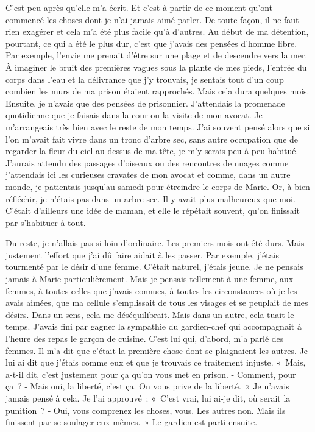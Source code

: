 \documentclass[french,twoside]{book} %
\begin{document}
C'est peu après qu’elle m’a écrit. Et c’est à partir de ce moment qu’ont commencé les choses dont je n’ai jamais aimé parler. De toute façon, il ne faut rien exagérer et cela m’a été plus facile qu’à d’autres. Au début de ma détention, pourtant, ce qui a été le plus dur, c’est que j’avais des pensées d’homme libre. Par exemple, l’envie me prenait d’être sur une plage et de descendre vers la mer. À imaginer le bruit des premières vagues sous la plante de mes pieds, l’entrée du corps dans l’eau et la délivrance que j’y trouvais, je sentais tout d’un coup combien les murs de ma prison étaient rapprochés. Mais cela dura quelques mois. Ensuite, je n’avais que des pensées de prisonnier. J'attendais la promenade quotidienne que je faisais dans la cour ou la visite de mon avocat. Je m’arrangeais très bien avec le reste de mon temps. J'ai souvent pensé alors que si l’on m’avait fait vivre dans un tronc d’arbre sec, sans autre occupation que de regarder la fleur du ciel au-dessus de ma tête, je m’y serais peu à peu habitué. J'aurais attendu des passages d’oiseaux ou des rencontres de nuages comme j’attendais ici les curieuses cravates de mon avocat et comme, dans un autre monde, je patientais jusqu’au samedi pour étreindre le corps de Marie. Or, à bien réfléchir, je n’étais pas dans un arbre sec. Il y avait plus malheureux que moi. C'était d’ailleurs une idée de maman, et elle le répétait souvent, qu’on finissait par s’habituer à tout.\par
Du reste, je n’allais pas si loin d’ordinaire. Les premiers mois ont été durs. Mais justement l’effort que j’ai dû faire aidait à les passer. Par exemple, j’étais tourmenté par le désir d’une femme. C'était naturel, j’étais jeune. Je ne pensais jamais à Marie particulièrement. Mais je pensais tellement à une femme, aux femmes, à toutes celles que j’avais connues, à toutes les circonstances où je les avais aimées, que ma cellule s’emplissait de tous les visages et se peuplait de mes désirs. Dans un sens, cela me déséquilibrait. Mais dans un autre, cela tuait le temps. J'avais fini par gagner la sympathie du gardien-chef qui accompagnait à l’heure des repas le garçon de cuisine. C'est lui qui, d’abord, m’a parlé des femmes. Il m’a dit que c’était la première chose dont se plaignaient les autres. Je lui ai dit que j’étais comme eux et que je trouvais ce traitement injuste. « Mais, a-t-il dit, c’est justement pour ça qu’on vous met en prison. - Comment, pour ça ? - Mais oui, la liberté, c’est ça. On vous prive de la liberté. » Je n’avais jamais pensé à cela. Je l’ai approuvé : « C'est vrai, lui ai-je dit, où serait la punition ? - Oui, vous comprenez les choses, vous. Les autres non. Mais ils finissent par se soulager eux-mêmes. » Le gardien est parti ensuite.\par
\end{document}
